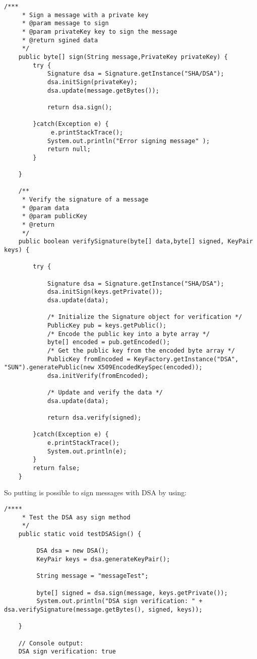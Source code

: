 \documentclass{article}
\begin{document}
\begin{verbatim}
/***
	 * Sign a message with a private key
	 * @param message to sign
	 * @param privateKey key to sign the message
	 * @return sgined data
	 */
	public byte[] sign(String message,PrivateKey privateKey) {
		try {
			Signature dsa = Signature.getInstance("SHA/DSA"); 
			dsa.initSign(privateKey);
			dsa.update(message.getBytes());

		    return dsa.sign();
		    
		}catch(Exception e) {
			 e.printStackTrace();
			System.out.println("Error signing message" );
			return null;
		}
		
	}
	
	/**
	 * Verify the signature of a message
	 * @param data
	 * @param publicKey
	 * @return
	 */
	public boolean verifySignature(byte[] data,byte[] signed, KeyPair keys) {
		
		try {

			Signature dsa = Signature.getInstance("SHA/DSA"); 
			dsa.initSign(keys.getPrivate());
			dsa.update(data);

	        /* Initialize the Signature object for verification */
	        PublicKey pub = keys.getPublic();
	        /* Encode the public key into a byte array */
	        byte[] encoded = pub.getEncoded();
	        /* Get the public key from the encoded byte array */
	        PublicKey fromEncoded = KeyFactory.getInstance("DSA", "SUN").generatePublic(new X509EncodedKeySpec(encoded));
	        dsa.initVerify(fromEncoded);

	        /* Update and verify the data */
	        dsa.update(data);
	        
	        return dsa.verify(signed);
	        
		}catch(Exception e) {
			e.printStackTrace();
			System.out.println(e);
		}
	    return false;
	}
\end{verbatim}
So putting is possible to sign messages with DSA by using:
\begin{verbatim}
/****
	 * Test the DSA asy sign method
	 */
	public static void testDSASign() {
		
		 DSA dsa = new DSA();
		 KeyPair keys = dsa.generateKeyPair();
		 
		 String message = "messageTest";
		 
		 byte[] signed = dsa.sign(message, keys.getPrivate());
		 System.out.println("DSA sign verification: " + dsa.verifySignature(message.getBytes(), signed, keys));
		    
	}
	
	// Console output:
	DSA sign verification: true
\end{verbatim}
\end{document}
